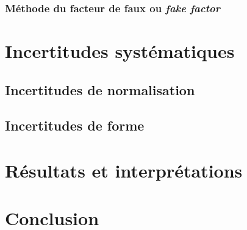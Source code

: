 \subsubsection{Méthode du facteur de faux ou \emph{fake factor}}\label{chapter-HTT_analysis-section-bg_estimation-subsec-data-subsubsec-FF_method}

\section{Incertitudes systématiques}\label{chapter-HTT_analysis-section-systematics}
\subsection{Incertitudes de normalisation}\label{chapter-HTT_analysis-section-systematics-subsec-normalisation}
\subsection{Incertitudes de forme}\label{chapter-HTT_analysis-section-systematics-subsec-shape}

\section{Résultats et interprétations}\label{chapter-HTT_analysis-section-results}

\section{Conclusion}\label{chapter-HTT_analysis-section-conclusion}

